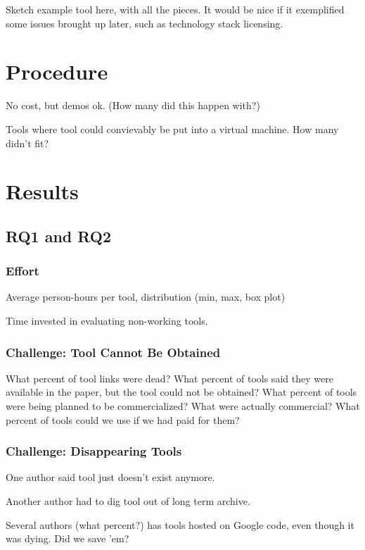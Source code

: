 \documentclass{sig-alternate-05-2015}
\begin{document}
Sketch example tool here, with all the pieces.
It would be nice if it exemplified some issues 
brought up later, such as technology stack licensing.

\section{Procedure}

No cost, but demos ok. (How many did this happen with?)

Tools where tool could convievably be put into a virtual machine. How many didn't fit?

\section{Results}

\subsection{RQ1 and RQ2}

\subsubsection{Effort}

Average person-hours per tool, distribution (min, max, box plot)

Time invested in evaluating non-working tools.

\subsubsection{Challenge: Tool Cannot Be Obtained}

What percent of tool links were dead?
What percent of tools said they were available in the paper, but the tool could not be obtained?
What percent of tools were being planned to be commercialized? What were actually commercial?
What percent of tools could we use if we had paid for them?

\subsubsection{Challenge: Disappearing Tools}

One author said tool just doesn't exist anymore.

Another author had to dig tool out of long term archive.

Several authors (what percent?) has tools hosted on Google code, even though it was dying.
Did we save 'em?
\end{document}
